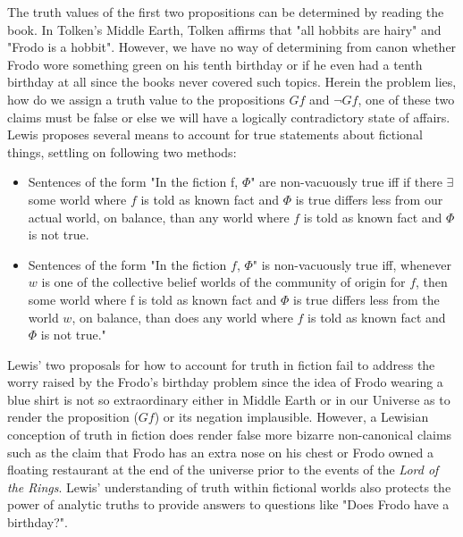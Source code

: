 The truth values of the first two propositions can be determined by reading the book. In Tolken's Middle Earth, Tolken affirms that "all hobbits are hairy" and "Frodo is a hobbit". However, we have no way of determining from canon whether Frodo wore something green on his tenth birthday or if he even had a tenth birthday at all since the books never covered such topics. Herein the problem lies, how do we assign a truth value to the propositions $Gf$ and $\neg Gf$, one of these two claims must be false or else we will have a logically contradictory state of affairs. 
	 Lewis proposes several means to account for true statements about fictional things, settling on following two methods: 
 \begin{itemize}
	\item Sentences of the form "In the fiction f, $\Phi$" are non-vacuously true iff if there $\exists$ some
world where $f$ is told as known fact and $\Phi$ is true differs less from our actual world, on
balance, than any world where $f$ is told as known fact and $\Phi$ is not true. \cite{Lewis1978-LEWTIF}
\item Sentences of the form "In the fiction $f$, $\Phi$" is non-vacuously true iff,
whenever $w$ is one of the collective belief worlds of the community of origin for $f$, then
some world where f is told as known fact and $\Phi$ is true differs less from the world $w$, on
balance, than does any world where $f$ is told as known fact and $\Phi$ is not true." \cite{Lewis1978-LEWTIF}
\end{itemize}
Lewis' two proposals for how to account for truth in fiction fail to address the worry raised by the Frodo's birthday problem since the idea of Frodo wearing a blue shirt is not so extraordinary either in Middle Earth or in our Universe as to render the proposition ($Gf$) or its negation implausible. However, a Lewisian conception of truth in fiction does render false more bizarre non-canonical claims such as the claim that Frodo has an extra nose on his chest or Frodo owned a floating restaurant at the end of the universe prior to the events of the \textit{Lord of the Rings}. Lewis' understanding of truth within fictional worlds also protects the power of analytic truths to provide answers to questions like "Does Frodo have a birthday?". \newline
